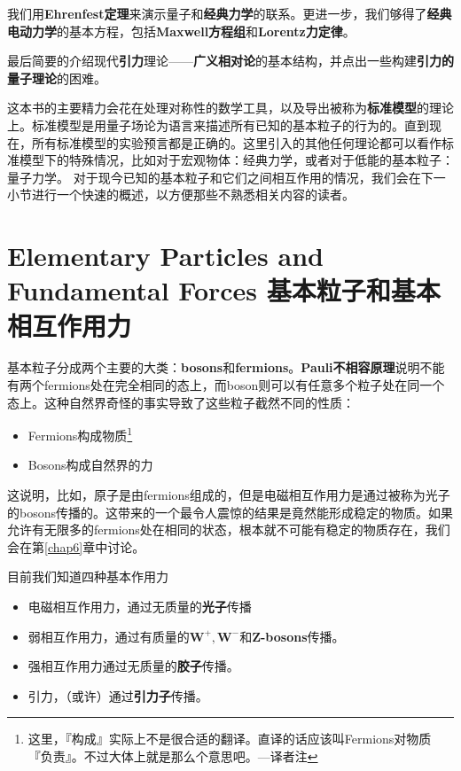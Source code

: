我们用{\bfseries Ehrenfest定理}来演示量子和{\bfseries 经典力学}的联系。更进一步，我们够得了{\bfseries 经典电动力学}的基本方程，包括{\bfseries Maxwell方程组}和{\bfseries Lorentz力定律}。

最后简要的介绍现代{\bfseries 引力}理论——{\bfseries 广义相对论}的基本结构，并点出一些构建{\bfseries 引力的量子理论}的困难。

这本书的主要精力会花在处理对称性的数学工具，以及导出被称为{\bfseries 标准模型}的理论上。标准模型是用量子场论为语言来描述所有已知的基本粒子的行为的。直到现在，所有标准模型的实验预言都是正确的。这里引入的其他任何理论都可以看作标准模型下的特殊情况，比如对于宏观物体：经典力学，或者对于低能的基本粒子：量子力学。
对于现今已知的基本粒子和它们之间相互作用的情况，我们会在下一小节进行一个快速的概述，以方便那些不熟悉相关内容的读者。

\section[基本粒子和基本相互作用力]{Elementary Particles and Fundamental Forces 基本粒子和基本相互作用力}\label{sec1.3}

基本粒子分成两个主要的大类：{\bfseries bosons}和{\bfseries fermions}。{\bfseries Pauli不相容原理}说明不能有两个fermions处在完全相同的态上，而boson则可以有任意多个粒子处在同一个态上。这种自然界奇怪的事实导致了这些粒子截然不同的性质：

\begin{itemize}
\item Fermions构成物质\footnote{这里，『构成』实际上不是很合适的翻译。直译的话应该叫Fermions对物质『负责』。不过大体上就是那么个意思吧。---译者注}
\item Bosons构成自然界的力
\end{itemize}

这说明，比如，原子是由fermions组成的，但是电磁相互作用力是通过被称为光子的bosons传播的。这带来的一个最令人震惊的结果是竟然能形成稳定的物质。如果允许有无限多的fermions处在相同的状态，根本就不可能有稳定的物质存在，我们会在第\ref{chap6}章中讨论。

目前我们知道四种基本作用力

\begin{itemize}
\item 电磁相互作用力，通过无质量的{\bfseries 光子}传播
\item 弱相互作用力，通过有质量的$\mathbf{W^+, W^-}$和\textbf{Z-bosons}传播。
\item 强相互作用力通过无质量的{\bfseries 胶子}传播。
\item 引力，（或许）通过{\bfseries 引力子}传播。
\end{itemize}

